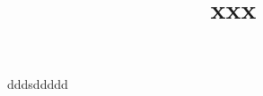 \documentclass[10pt,a4paper]{article}
\title{xxx}
\begin{document}
\maketitle	
dddsddddd
\end{document}
